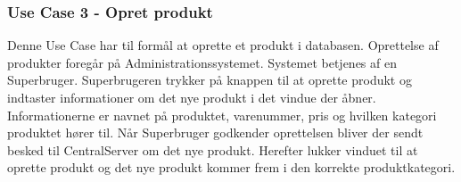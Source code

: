 \subsubsection{Use Case 3 - Opret produkt}
Denne Use Case har til formål at oprette et produkt i databasen. Oprettelse af produkter foregår på Administrationssystemet. Systemet betjenes af en Superbruger. Superbrugeren trykker på knappen til at oprette produkt og indtaster informationer om det nye produkt i det vindue der åbner. Informationerne er navnet på produktet, varenummer, pris og hvilken kategori produktet hører til. Når Superbruger godkender oprettelsen bliver der sendt besked til CentralServer om det nye produkt. Herefter lukker vinduet til at oprette produkt og det nye produkt kommer frem i den korrekte produktkategori.